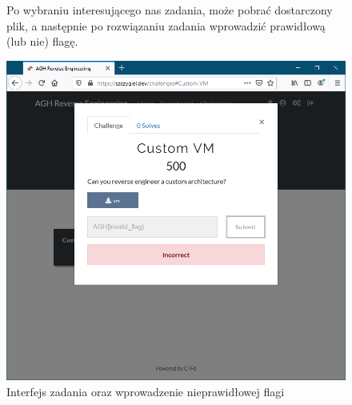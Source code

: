 \documentclass[polish,12pt]{aghthesis}
\begin{document}
\begin{figure}[ht]
    Po wybraniu interesującego nas zadania, może pobrać dostarczony plik,
    a następnie po rozwiązaniu zadania wprowadzić prawidłową (lub nie) flagę.

    \vspace{1cm}

    \centering
    \includegraphics[width=14cm]{szczygiel_dev_incorrect}
    \caption{Interfejs zadania oraz wprowadzenie nieprawidłowej flagi}
    \label{fig:szczygiel_dev_incorrect}
\end{figure}
\end{document}
